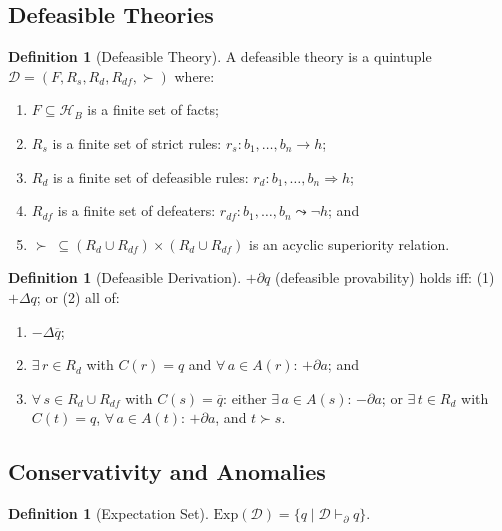 \documentclass{article}
\theoremstyle{definition}
\newtheorem{definition}[theorem]{Definition}
\newcommand{\D}{\mathcal{D}}
\newcommand{\HB}{\mathcal{H}_B}
\newcommand{\Rs}{R_s}
\newcommand{\Rd}{R_d}
\newcommand{\Rdf}{R_{df}}
\newcommand{\Exp}{\mathrm{Exp}}
\newcommand{\pPartial}{\vdash_{\partial}}
\newcommand{\defto}{\Rightarrow}
\newcommand{\strictto}{\rightarrow}
\newcommand{\defeatto}{\leadsto}
\newcommand{\comp}[1]{\overline{#1}}
\begin{document}
\subsection{Defeasible Theories}

\begin{definition}[Defeasible Theory]\label{def:deftheory}
A defeasible theory is a quintuple $\D = (F, \Rs, \Rd, \Rdf, {\succ})$ where:
\begin{enumerate}[label=(\roman*)]
    \item $F \subseteq \HB$ is a finite set of facts;
    \item $\Rs$ is a finite set of strict rules: $r_s\colon b_1, \ldots, b_n \strictto h$;
    \item $\Rd$ is a finite set of defeasible rules: $r_d\colon b_1, \ldots, b_n \defto h$;
    \item $\Rdf$ is a finite set of defeaters: $r_{df}\colon b_1, \ldots, b_n \defeatto \neg h$; and
    \item ${\succ} \;\subseteq (\Rd \cup \Rdf) \times (\Rd \cup \Rdf)$ is an acyclic superiority relation.
\end{enumerate}
\end{definition}

\begin{definition}[Defeasible Derivation]\label{def:defderiv}
$+\partial q$ (defeasible provability) holds iff: (1) $+\Delta q$; or (2) all of:
\begin{enumerate}[label=(\alph*)]
    \item $-\Delta \comp{q}$;
    \item $\exists\, r \in \Rd$ with $C(r) = q$ and $\forall\, a \in A(r)$: $+\partial a$; and
    \item $\forall\, s \in \Rd \cup \Rdf$ with $C(s) = \comp{q}$: either $\exists\, a \in A(s)$: $-\partial a$; or $\exists\, t \in \Rd$ with $C(t) = q$, $\forall\, a \in A(t)$: $+\partial a$, and $t \succ s$.
\end{enumerate}
\end{definition}

\subsection{Conservativity and Anomalies}

\begin{definition}[Expectation Set]\label{def:expectation}
$\Exp(\D) = \{q \mid \D \pPartial q\}$.
\end{definition}
\end{document}
